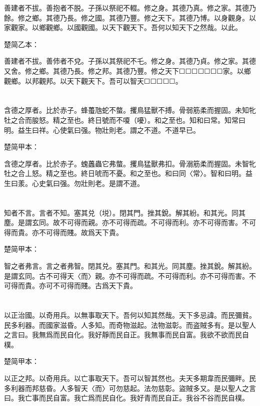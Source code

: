 \documentclass[a5paper]{ctexbook}
\begin{document}
    善建者不拔。善抱者不脱。子孫以祭祀不輟。修之身。其德乃真。修之家。其德乃餘。修之鄉。其德乃長。修之國。其德乃豐。修之天下。其德乃博。以身觀身。以家觀家。以鄉觀鄉。以國觀國。以天下觀天下。吾何以知天下之然哉。以此。

    楚简乙本：

    善建者不拔。善伂者不兌。子孫以其祭祀不乇。修之身。其德乃貞。修之家。其德又舍。修之鄉。其德乃長。修之邦。其德乃豐。修之天下☐☐☐☐☐☐☐家。以鄉觀鄉。以邦觀邦。以天下觀天下。吾可以智天☐☐☐☐☐。

    \chapter{}

    含德之厚者。比於赤子。蜂蠆虺蛇不螫。攫鳥猛獸不搏。骨弱筋柔而握固。未知牝牡之合而朘怒。精之至也。終日號而不嗄（嚘）。和之至也。知和曰常。知常曰明。益生曰祥。心使氣曰强。物壯則老。謂之不道。不道早已。

    楚简甲本：

    含德之厚者。比於赤子。螝䘍蟲它弗螫。攫鳥猛獸弗扣。骨溺筋柔而握固。未智牝牡之合丄怒。精之至也。終日唬而不憂。和之至也。和曰同〈常〉。智和曰明。益生曰羕。心史氣曰强。勿壯則老。是謂不道。

    \chapter{}

    知者不言。言者不知。塞其兑（㙂）。閉其門。挫其銳。解其紛。和其光。同其塵。是謂玄同。故不可得而親。亦不可得而疏。不可得而利。亦不可得而害。不可得而貴。亦不可得而賤。故爲天下貴。

    楚简甲本：

    智之者弗言。言之者弗智。閉其兑。塞其門。和其光。同其塵。挫其銳。解其紛。是謂玄同。古不可得天〈而〉親。亦不可得而疏。不可得而利。亦不可得而害。不可得而貴。亦可不可得而賤。古爲天下貴。

    \chapter{}

    以正治國。以奇用兵。以無事取天下。吾何以知其然哉。天下多忌諱。而民彌貧。民多利器。而國家滋昏。人多知。而奇物滋起。法物滋彰。而盗賊多有。是以聖人之言曰。我無爲而民自化。我好靜而民自正。我無事而民自富。我欲不欲而民自樸。

    楚简甲本：

    以正之邦。以奇用兵。以亡事取天下。吾可以智其然也。夫天多期韋而民彌畔。民多利器而邦慈昏。人多智天〈而〉可勿慈起。法勿慈彰。盜賊多又。是以聖人之言曰。我亡事而民自富。我亡爲而民自化。我好青而民自正。我谷不谷而民自樸。
\end{document}
